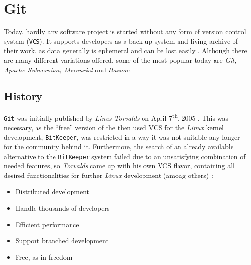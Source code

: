 \section{Git}
\label{sec:git}

Today, hardly any software project is started without any form of version control system (\texttt{VCS}). It supports developers as a back-up system and living archive of their work, as data generally is ephemeral and can be lost easily \cite[1]{loeliger2012version}. Although there are many different variations offered, some of the most popular today are \emph{Git, Apache Subversion, Mercurial} and \emph{Bazaar}.

\subsection{History}
\label{sec:git-history}
\texttt{Git} was initially published by \emph{Linus Torvalds} on April 7\textsuperscript{th}, 2005 \cite[6]{loeliger2012version}. This was necessary, as the ``free'' version of the then used VCS for the \emph{Linux} kernel development, \texttt{BitKeeper}, was restricted in a way it was not suitable any longer for the community behind it. Furthermore, the search of an already available alternative to the \texttt{BitKeeper} system failed due to an unsatisfying combination of needed features, so \emph{Torvalds} came up with his own VCS flavor, containing all desired functionalities for further \emph{Linux} development (among others) \cite[4]{loeliger2012version}:

\begin{itemize}
  \item Distributed development
  \item Handle thousands of developers
  \item Efficient performance
  \item Support branched development
  \item Free, as in freedom
\end{itemize}

